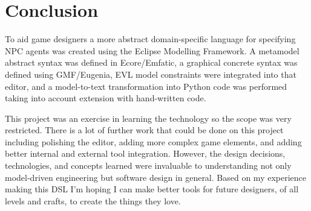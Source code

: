 \documentclass[letterpaper,12pt]{article}  %
\begin{document}


\section{Conclusion}
To aid game designers a more abstract domain-specific language for specifying NPC agents was created using the Eclipse Modelling Framework. A metamodel abstract syntax was defined in Ecore/Emfatic, a graphical concrete syntax was defined using GMF/Eugenia, EVL model constraints were integrated into that editor, and a model-to-text transformation into Python code was performed taking into account extension with hand-written code.

This project was an exercise in learning the technology so the scope was very restricted. There is a lot of further work that could be done on this project including polishing the editor, adding more complex game elements, and adding better internal and external tool integration.
However, the design decisions, technologies, and concepts learned were invaluable to understanding not only model-driven engineering but software design in general.
Based on my experience making this DSL I’m hoping I can make better tools for future designers, of all levels and crafts, to create the things they love.





\newpage
\appendix  %


\end{document}
